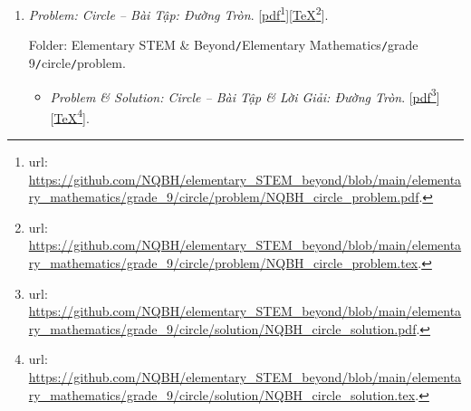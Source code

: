 \documentclass[12pt,twoside]{book}
\begin{document}
\begin{enumerate}
	\begin{itemize}
		\item {\it Problem \& Solution: Trigonometry in Triangles -- Bài Tập \& Lời Giải: Hệ Thức Lượng Trong Tam Giác $\sin\alpha,\cos\alpha,\tan\alpha,\cot\alpha$}. [\href{https://github.com/NQBH/elementary_STEM_beyond/blob/main/elementary_mathematics/grade_9/trigonometry/solution/NQBH_trigonometry_solution.pdf}{pdf}\footnote{{\sc url}: \url{https://github.com/NQBH/elementary_STEM_beyond/blob/main/elementary_mathematics/grade_9/trigonometry/solution/NQBH_trigonometry_solution.pdf}.}][\href{https://github.com/NQBH/elementary_STEM_beyond/blob/main/elementary_mathematics/grade_9/trigonometry/solution/NQBH_trigonometry_solution.tex}{\TeX}\footnote{{\sc url}: \url{https://github.com/NQBH/elementary_STEM_beyond/blob/main/elementary_mathematics/grade_9/trigonometry/solution/NQBH_trigonometry_solution.tex}.}].
		
		Folder: {\sf Elementary STEM \& Beyond{\tt/}Elementary Mathematics{\tt/}grade 9{\tt/}trigonometry triangle{\tt/}solution}.
	\end{itemize}
	\item {\it Problem: Circle -- Bài Tập: Đường Tròn}. [\href{https://github.com/NQBH/elementary_STEM_beyond/blob/main/elementary_mathematics/grade_9/circle/problem/NQBH_circle_problem.pdf}{pdf}\footnote{{\sc url}: \url{https://github.com/NQBH/elementary_STEM_beyond/blob/main/elementary_mathematics/grade_9/circle/problem/NQBH_circle_problem.pdf}.}][\href{https://github.com/NQBH/elementary_STEM_beyond/blob/main/elementary_mathematics/grade_9/circle/problem/NQBH_circle_problem.tex}{\TeX}\footnote{{\sc url}: \url{https://github.com/NQBH/elementary_STEM_beyond/blob/main/elementary_mathematics/grade_9/circle/problem/NQBH_circle_problem.tex}.}].
	
	Folder: {\sf Elementary STEM \& Beyond{\tt/}Elementary Mathematics{\tt/}grade 9{\tt/}circle{\tt/}problem}.
	\begin{itemize}
		\item {\it Problem \& Solution: Circle -- Bài Tập \& Lời Giải: Đường Tròn}. [\href{https://github.com/NQBH/elementary_STEM_beyond/blob/main/elementary_mathematics/grade_9/circle/solution/NQBH_circle_solution.pdf}{pdf}\footnote{{\sc url}: \url{https://github.com/NQBH/elementary_STEM_beyond/blob/main/elementary_mathematics/grade_9/circle/solution/NQBH_circle_solution.pdf}.}][\href{https://github.com/NQBH/elementary_STEM_beyond/blob/main/elementary_mathematics/grade_9/circle/solution/NQBH_circle_solution.tex}{\TeX}\footnote{{\sc url}: \url{https://github.com/NQBH/elementary_STEM_beyond/blob/main/elementary_mathematics/grade_9/circle/solution/NQBH_circle_solution.tex}.}].
		

\end{itemize}
\end{enumerate}
\end{document}
